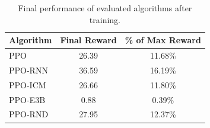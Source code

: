 \begin{table}[h]
\centering
\begin{tabular}{lcc}
\hline
\textbf{Algorithm} & \textbf{Final Reward} & \textbf{\% of Max Reward} \\
\hline
PPO & 26.39 & 11.68\% \\
PPO-RNN & 36.59 & 16.19\% \\
PPO-ICM & 26.66 & 11.80\% \\
PPO-E3B & 0.88 & 0.39\% \\
PPO-RND & 27.95 & 12.37\% \\
\hline
\end{tabular}
\caption{Final performance of evaluated algorithms after training.}
\label{tab:final_results}
\end{table}
